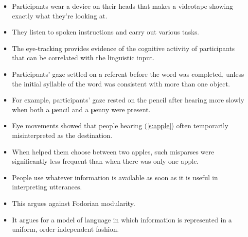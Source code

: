 \documentclass[a4paper,landscape,headrule,footrule]{foils}
\begin{document}
\begin{itemize}
\item Participants wear a device on their heads that makes 
a videotape showing exactly what they’re looking at.
\item They listen to spoken instructions and carry out 
various tasks. 
\item The eye-tracking provides evidence of the 
cognitive activity of participants that can be 
correlated with the linguistic input. 
\end{itemize}



\begin{itemize}
\item Participants’ gaze settled on a referent before the 
word was completed, unless the initial syllable of the 
word was consistent with more than one object.  
\item For example, participants’ gaze rested on the pencil 
after hearing 
more slowly when both a \textbf{p}encil and a \textbf{p}enny were 
present.
\end{itemize}



\begin{itemize}
\item Eye movements showed that people hearing (\ref{s:apple}) often 
temporarily misinterpreted  as the 
destination.
\begin{exe}
  \ex \label{s:apple} 
\end{exe}
\item When  helped them choose between two 
apples, such misparses were significantly less 
frequent than when there was only one apple.
\end{itemize}



\begin{itemize}
\item People use whatever information is available as 
soon as it is useful in interpreting utterances.
\item This argues against Fodorian modularity.
\item It argues for a model of language in which 
information is represented in a uniform,
order-independent fashion.
\end{itemize}
\end{document}
